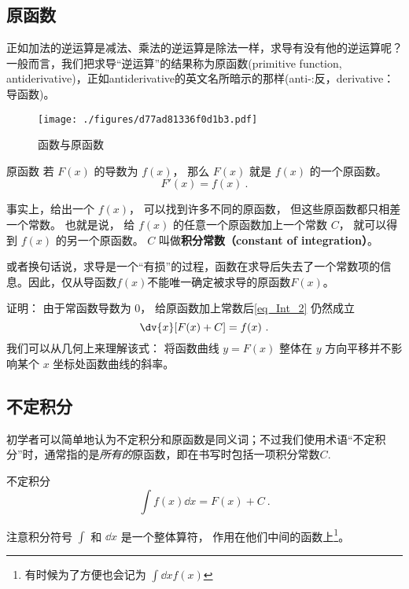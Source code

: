 
\subsection{原函数}
正如加法的逆运算是减法、乘法的逆运算是除法一样，求导有没有他的逆运算呢？一般而言，我们把求导“逆运算”的结果称为原函数(primitive function, antiderivative)，正如antiderivative的英文名所暗示的那样(anti-:反，derivative：导函数)。

\begin{figure}[ht]
\centering
\texttt{[image: ./figures/d77ad81336f0d1b3.pdf]}
\caption{函数与原函数} \label{fig_Int_1}
\end{figure}

\begin{definition}{原函数}
若 $F(x)$ 的导数为 $f(x)$， 那么 $F(x)$ 就是  $f(x)$ 的一个原函数。
\begin{equation}\label{eq_Int_2}
F'(x) = f(x)~.
\end{equation}
\end{definition}

\begin{theorem}{}
事实上，给出一个 $f(x)$， 可以找到许多不同的原函数， 但这些原函数都只相差一个常数。 也就是说， 给 $f(x)$ 的任意一个原函数加上一个常数 $C$， 就可以得到 $f(x)$ 的另一个原函数。 $C$ 叫做\textbf{积分常数（constant of integration）}。

或者换句话说，求导是一个“有损”的过程，函数在求导后失去了一个常数项的信息。因此，仅从导函数$f(x)$不能唯一确定被求导的原函数$F(x)$。
\end{theorem}

证明： 由于常函数导数为 $0$， 给原函数加上常数后\autoref{eq_Int_2} 仍然成立
\begin{equation}\label{eq_Int_3}
\dv{x} [F(x) + C] = f(x)~.
\end{equation}
我们可以从几何上来理解该式： 将函数曲线 $y = F(x)$ 整体在 $y$ 方向平移并不影响某个 $x$ 坐标处函数曲线的斜率。

\subsection{不定积分}
初学者可以简单地认为不定积分和原函数是同义词；不过我们使用术语“不定积分”时，通常指的是\textsl{所有的}原函数，即在书写时包括一项积分常数$C$.

\begin{definition}{不定积分}
\begin{equation}\label{eq_Int_1}
\int f(x) \dd{x} = F(x) + C~.
\end{equation}
\end{definition}
注意积分符号 $\int$ 和 $\dd{x}$ 是一个整体算符， 作用在他们中间的函数上\footnote{有时候为了方便也会记为 $\int\dd{x} f(x)$}。

